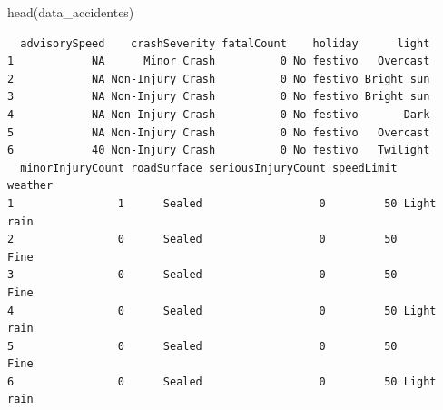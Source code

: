 \documentclass[
  letterpaper,
  DIV=11,
  numbers=noendperiod]{scrartcl}
\newenvironment{Shaded}{\begin{snugshade}}{\end{snugshade}}
\newcommand{\FunctionTok}[1]{\textcolor[rgb]{0.28,0.35,0.67}{#1}}
\newcommand{\NormalTok}[1]{\textcolor[rgb]{0.00,0.23,0.31}{#1}}
\newcommand{\OtherTok}[1]{\textcolor[rgb]{0.00,0.23,0.31}{#1}}
\newcommand{\SpecialCharTok}[1]{\textcolor[rgb]{0.37,0.37,0.37}{#1}}
\newcommand{\StringTok}[1]{\textcolor[rgb]{0.13,0.47,0.30}{#1}}
\begin{document}
\begin{Shaded}
\end{Shaded}

\begin{Shaded}
\begin{Highlighting}[]
\FunctionTok{head}\NormalTok{(data\_accidentes)}
\end{Highlighting}
\end{Shaded}

\begin{verbatim}
  advisorySpeed    crashSeverity fatalCount    holiday      light
1            NA      Minor Crash          0 No festivo   Overcast
2            NA Non-Injury Crash          0 No festivo Bright sun
3            NA Non-Injury Crash          0 No festivo Bright sun
4            NA Non-Injury Crash          0 No festivo       Dark
5            NA Non-Injury Crash          0 No festivo   Overcast
6            40 Non-Injury Crash          0 No festivo   Twilight
  minorInjuryCount roadSurface seriousInjuryCount speedLimit    weather
1                1      Sealed                  0         50 Light rain
2                0      Sealed                  0         50       Fine
3                0      Sealed                  0         50       Fine
4                0      Sealed                  0         50 Light rain
5                0      Sealed                  0         50       Fine
6                0      Sealed                  0         50 Light rain
\end{verbatim}
\end{document}
